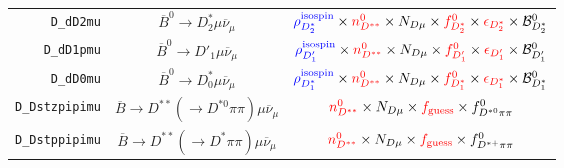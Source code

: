 \begin{landscape}
\begin{table}
\begin{tabular}{r|c|c}
        \texttt{D\_dD2mu} &              $\overline{B}^0 \rightarrow D^*_2 \mu \overline{\nu}_\mu$               &                                                                                  $\textcolor{blue}{\rho^\text{isospin}_{D_2^*}} \times \textcolor{red}{n^{0}_{D^{**}}} \times N_{D \mu} \times \textcolor{red}{f^{0}_{D_2^*}} \times \textcolor{red}{\epsilon_{D_2^*}} \times \mathcal{B}^{0}_{D_2^*}$                                                                                   \\
       \texttt{D\_dD1pmu} &               $\overline{B}^0 \rightarrow D'_1 \mu \overline{\nu}_\mu$               &                                                                                    $\textcolor{blue}{\rho^\text{isospin}_{D'_1}} \times \textcolor{red}{n^{0}_{D^{**}}} \times N_{D \mu} \times \textcolor{red}{f^{0}_{D'_1}} \times \textcolor{red}{\epsilon_{D'_1}} \times \mathcal{B}^{0}_{D'_1}$                                                                                     \\
        \texttt{D\_dD0mu} &              $\overline{B}^0 \rightarrow D^*_0 \mu \overline{\nu}_\mu$               &                                                                                  $\textcolor{blue}{\rho^\text{isospin}_{D_1^*}} \times \textcolor{red}{n^{0}_{D^{**}}} \times N_{D \mu} \times \textcolor{red}{f^{0}_{D_1^*}} \times \textcolor{red}{\epsilon_{D_1^*}} \times \mathcal{B}^{0}_{D_1^*}$                                                                                   \\
   \texttt{D\_Dstzpipimu} & $\overline{B} \rightarrow D^{**} (\rightarrow D^{*0} \pi\pi) \mu \overline{\nu}_\mu$ &                                                                                                                                   $\textcolor{red}{n^{0}_{D^{**}}} \times N_{D \mu} \times \textcolor{red}{f_\text{guess}} \times f^0_{D^{*0}\pi\pi}$                                                                                                                                    \\
   \texttt{D\_Dstppipimu} &  $\overline{B} \rightarrow D^{**} (\rightarrow D^* \pi\pi) \mu \overline{\nu}_\mu$   &                                                                                                                                   $\textcolor{red}{n^{0}_{D^{**}}} \times N_{D \mu} \times \textcolor{red}{f_\text{guess}} \times f^0_{D^{*+}\pi\pi}$                                                                                                                                    \\

\end{tabular}
\end{table}
\end{landscape}
